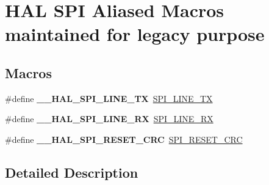 \hypertarget{group___h_a_l___s_p_i___aliased___macros}{}\section{H\+AL S\+PI Aliased Macros maintained for legacy purpose}
\label{group___h_a_l___s_p_i___aliased___macros}
\subsection*{Macros}
\begin{DoxyCompactItemize}
\item 
\mbox{\label{group___h_a_l___s_p_i___aliased___macros_gab21df59cf07dc6839768a4aed3219801}} 
\#define {\bfseries \+\_\+\+\_\+\+H\+A\+L\+\_\+\+S\+P\+I\+\_\+L\+I\+N\+E\+\_\+\+TX}~\mbox{\hyperlink{group___s_p_i___private___macros_gae3b2eb5e818e58b66474d42dedac5523}{S\+P\+I\+\_\+L\+I\+N\+E\+\_\+\+TX}}
\item 
\mbox{\label{group___h_a_l___s_p_i___aliased___macros_ga34ee4bd3329208207be8fca1f2b6e614}} 
\#define {\bfseries \+\_\+\+\_\+\+H\+A\+L\+\_\+\+S\+P\+I\+\_\+L\+I\+N\+E\+\_\+\+RX}~\mbox{\hyperlink{group___s_p_i___private___macros_gaa8d58cef91c1874d5a4dde4014cf6269}{S\+P\+I\+\_\+L\+I\+N\+E\+\_\+\+RX}}
\item 
\mbox{\label{group___h_a_l___s_p_i___aliased___macros_gaf58ad00b4183d30205773445099d066b}} 
\#define {\bfseries \+\_\+\+\_\+\+H\+A\+L\+\_\+\+S\+P\+I\+\_\+\+R\+E\+S\+E\+T\+\_\+\+C\+RC}~\mbox{\hyperlink{group___s_p_i___private___macros_gab120a0085b72939e7d19c4f6b3381a99}{S\+P\+I\+\_\+\+R\+E\+S\+E\+T\+\_\+\+C\+RC}}
\end{DoxyCompactItemize}


\subsection{Detailed Description}
